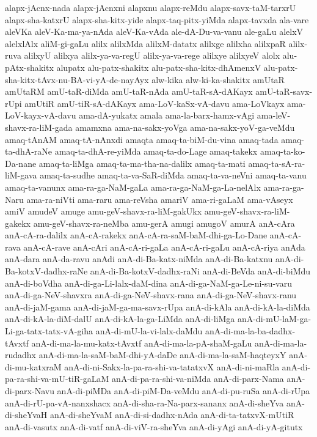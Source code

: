 {alapx-jAcnx-nada
alapx-jAcnxni
alapxnu
alapx-reMdu
alapx-savx-taM-tarxrU
alapx-sha-katxrU
alapx-sha-kitx-yide
alapx-taq-pitx-yiMda
alapx-tavxda
ala-vare
aleVKa
aleV-Ka-ma-ya-nAda
aleV-Ka-vAda
ale-dA-Du-va-vanu
ale-gaLu
alelxV
alelxlAlx
aliM-gi-gaLu
alilx
alilxMda
alilxM-datatx
alilxge
alilxha
alilxpaR
alilx-ruva
alilxyU
alilxya
alilx-ya-va-regU
alilx-ya-va-rege
alilxye
alilxyeV
alolx
alu-pAtx-shakitx
alupatx
alu-patx-shakitx
alu-patx-sha-kitx-dhAmenxV
alu-patx-sha-kitx-tAvx-nu-BA-vi-yA-de-nayAyx
alw-kika
alw-ki-ka-shakitx
amUtaR
amUtaRM
amU-taR-diMda
amU-taR-nAda
amU-taR-sA-dAKayx
amU-taR-savx-rUpi
amUtiR
amU-tiR-sA-dAKayx
ama-LoV-kaSx-vA-davu
ama-LoVkayx
ama-LoV-kayx-vA-davu
ama-dA-yukatx
amala
ama-la-barx-hamx-vAgi
ama-leV-shavx-ra-liM-gada
amamxna
ama-na-sakx-yoVga
ama-na-sakx-yoV-ga-veMdu
amaq-tAnAM
amaq-tA-nAnxdi
amaqta
amaq-ta-biM-du-vina
amaq-tada
amaq-ta-dhA-raNe
amaq-ta-dhA-re-yiMda
amaq-ta-do-Lage
amaq-takekx
amaq-ta-ko-Da-nane
amaq-ta-liMga
amaq-ta-ma-tha-na-dalilx
amaq-ta-mati
amaq-ta-sA-ra-liM-gava
amaq-ta-sudhe
amaq-ta-va-SaR-diMda
amaq-ta-va-neVni
amaq-ta-vanu
amaq-ta-vanunx
ama-ra-ga-NaM-gaLa
ama-ra-ga-NaM-ga-La-nelAlx
ama-ra-ga-Naru
ama-ra-niVti
ama-raru
ama-reVsha
amariV
ama-ri-gaLaM
ama-vAseyx
amiV
amudeV
amuge
amu-geV-shavx-ra-liM-gakUkx
amu-geV-shavx-ra-liM-gakekx
amu-geV-shavx-ra-neMba
amu-gerA
amugi
amugoV
amurA
anA-cAra
anA-cA-ra-dalilx
anA-cA-rakekx
anA-cA-ra-saM-baM-dhi-ga-Lo-Dane
anA-cA-rava
anA-cA-rave
anA-cAri
anA-cA-ri-gaLa
anA-cA-ri-gaLu
anA-cA-riya
anAda
anA-dara
anA-da-ravu
anAdi
anA-di-Ba-katx-niMda
anA-di-Ba-katxnu
anA-di-Ba-kotxV-dadhx-raNe
anA-di-Ba-kotxV-dadhx-raNi
anA-di-BeVda
anA-di-biMdu
anA-di-boVdha
anA-di-ga-Li-lalx-daM-dina
anA-di-ga-NaM-ga-Le-ni-su-varu
anA-di-ga-NeV-shavxra
anA-di-ga-NeV-shavx-rana
anA-di-ga-NeV-shavx-ranu
anA-di-jaM-gama
anA-di-jaM-ga-ma-savx-rUpa
anA-di-kAla
anA-di-kA-la-diMda
anA-di-kA-la-diM-dalU
anA-di-kA-la-ga-LiMda
anA-di-liMga
anA-di-mU-laM-ga-Li-ga-tatx-tatx-vA-giha
anA-di-mU-la-vi-lalx-daMdu
anA-di-ma-la-ba-dadhx-tAvxtf
anA-di-ma-la-mu-katx-tAvxtf
anA-di-ma-la-pA-shaM-gaLu
anA-di-ma-la-rudadhx
anA-di-ma-la-saM-baM-dhi-yA-daDe
anA-di-ma-la-saM-haqteyxY
anA-di-mu-katxraM
anA-di-ni-Sakx-la-pa-ra-shi-va-tatatxvX
anA-di-ni-maRla
anA-di-pa-ra-shi-va-mU-tiR-gaLaM
anA-di-pa-ra-shi-va-niMda
anA-di-parx-Nama
anA-di-parx-Navu
anA-di-piMDa
anA-di-piM-Da-veMdu
anA-di-pu-ruSa
anA-di-rUpa
anA-di-rU-pa-vA-nanxshacx
anA-di-sha-ra-Na-parx-sananx
anA-di-sheYva
anA-di-sheYvaH
anA-di-sheYvaM
anA-di-si-dadhx-nAda
anA-di-ta-tatxvX-mUtiR
anA-di-vasutx
anA-di-vatf
anA-di-viV-ra-sheYva
anA-di-yAgi
anA-di-yA-gitutx
}
